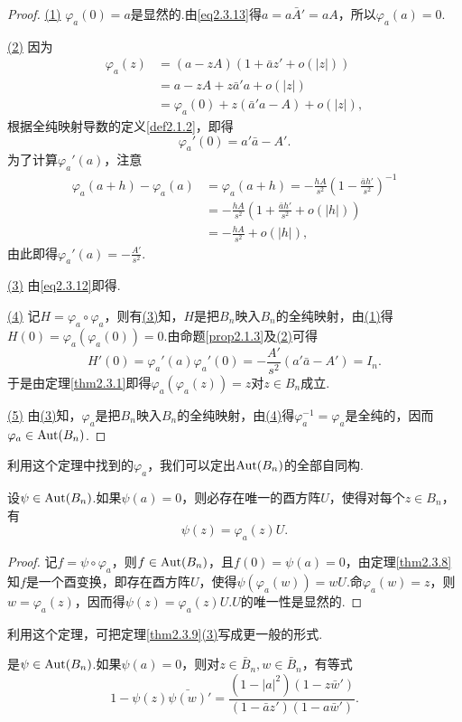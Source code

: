 \begin{proof}
	\hyperlink{2.3.9}{(1)}
	$\varphi_a(0)=a$是显然的.由\eqref{eq2.3.13}得$a=a\bar{A}'=aA$，所以$\varphi_a(a)=0$.
	
	\hyperlink{2.3.9}{(2)}
	因为
	\begin{align*}
		\varphi_a(z)
		&=(a-zA)(1+\bar{a}z'+o(|z|))\\
		&=a-zA+z\bar{a}'a+o(|z|)\\
		&=\varphi_a(0)+z(\bar{a}'a-A)+o(|z|),
	\end{align*}
根据全纯映射导数的定义\ref{def2.1.2}，即得
\[\varphi_a'(0)=a'\bar{a}-A'.\]
为了计算$\varphi_a'(a)$，注意
\begin{align*}
	\varphi_a(a+h)-\varphi_a(a)
	&=\varphi_a(a+h)=-\frac{hA}{s^2}\left(1-\frac{\bar{a}h'}{s^2}\right)^{-1}\\
	&=-\frac{hA}{s^2}\left(1+\frac{\bar{a}h'}{s^2}+o(|h|)\right)\\
	&=-\frac{hA}{s^2}+o(|h|),
\end{align*}
由此即得$\varphi_a'(a)=-\frac{A'}{s^2}$.
	
	\hyperlink{2.3.9}{(3)}
	由\eqref{eq2.3.12}即得.
	
	\hyperlink{2.3.9}{(4)}
	记$H=\varphi_a \circ\varphi_a$，则有\hyperlink{2.3.9}{(3)}知，$H$是把$B_n$映入$B_n$的全纯映射，由\hyperlink{2.3.9}{(1)}得$H(0)=\varphi_a(\varphi_a(0))=0$.由命题\ref{prop2.1.3}及\hyperlink{2.3.9}{(2)}可得
	\[H'(0)=\varphi_a'(a)\varphi_a'(0)=-\frac{A'}{s^2}(a'\bar{a}-A')=I_n.\]
	于是由定理\ref{thm2.3.1}即得$\varphi_a(\varphi_a(z))=z$对$z\in B_n$成立.
	
	\hyperlink{2.3.9}{(5)}
	由\hyperlink{2.3.9}{(3)}知，$\varphi_a$是把$B_n$映入$B_n$的全纯映射，由\hyperlink{2.3.9}{(4)}得$\varphi_a^{-1}=\varphi_a$是全纯的，因而$\varphi_a\in\operatorname{Aut}(B_n)$.
\end{proof}
利用这个定理中找到的$\varphi_a$，我们可以定出$\operatorname{Aut}(B_n)$的全部自同构.
\begin{theorem}\label{thm2.3.10}
	设$\psi\in\operatorname{Aut}(B_n)$.如果$\psi(a)=0$，则必存在唯一的酉方阵$U$，使得对每个$z\in B_n$，有
	\[\psi(z)=\varphi_a(z)U.\]
\end{theorem}
\begin{proof}
	记$f=\psi\circ\varphi_a$，则$f\in\operatorname{Aut}(B_n)$，且$f(0)=\psi(a)=0$，由定理\ref{thm2.3.8}知$f$是一个酉变换，即存在酉方阵$U$，使得$\psi(\varphi_a(w))=wU$.命$\varphi_a(w)=z$，则$w=\varphi_a(z)$，因而得$\psi(z)=\varphi_a(z)U.U$的唯一性是显然的.
\end{proof}
利用这个定理，可把定理\ref{thm2.3.9}\hyperlink{2.3.9}{(3)}写成更一般的形式.
\begin{prop}\label{prop2.3.11}
	是$\psi\in\operatorname{Aut}(B_n)$.如果$\psi(a)=0$，则对$z\in\bar{B}_n,w\in\bar{B}_n$，有等式
	\begin{equation}\label{eq2.3.15}
		1-\psi(z)\bar{\psi(w)}'=\frac{(1-|a|^2)(1-z\bar{w}')}{(1-\bar{a}z')(1-a\bar{w}')}.
	\end{equation}
\end{prop}
